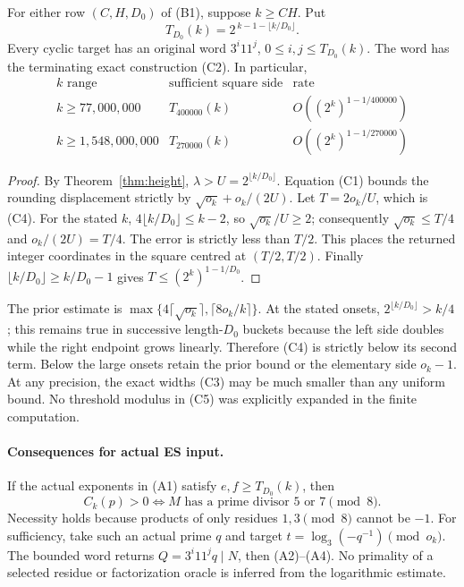 \begin{theorem}\label{thm:capacity}
For either row $(C,H,D_0)$ of (B1), suppose $k\ge CH$. Put
\[
 \boxed{T_{D_0}(k)=2^{\,k-1-\lfloor k/D_0\rfloor}.}        \tag{C4}
\]
Every cyclic target has an original word $3^i11^j$, $0\le i,j\le T_{D_0}(k)$.
The word has the terminating exact construction (C2). In particular,
\[
\begin{array}{c|c|c}
 k\text{ range}&\text{sufficient square side}&\text{rate}\\\hline
 k\ge77{,}000{,}000&T_{400000}(k)&O((2^k)^{1-1/400000})\\
 k\ge1{,}548{,}000{,}000&T_{270000}(k)&O((2^k)^{1-1/270000})
\end{array}                                                   \tag{C5}
\]
\end{theorem}
\begin{proof}
By Theorem~\ref{thm:height}, $\lambda>U=2^{\lfloor k/D_0\rfloor}$.
Equation (C1) bounds the rounding displacement strictly by
$\sqrt{o_k}+o_k/(2U)$. Let $T=2o_k/U$, which is (C4).
For the stated $k$, $4\lfloor k/D_0\rfloor\le k-2$, so
$\sqrt{o_k}/U\ge2$; consequently $\sqrt{o_k}\le T/4$ and
$o_k/(2U)=T/4$. The error is strictly less than $T/2$.
This places the returned integer coordinates in the square centred at $(T/2,T/2)$.
Finally $\lfloor k/D_0\rfloor\ge k/D_0-1$ gives
$T\le(2^k)^{1-1/D_0}$.
\end{proof}

The prior estimate is
$\max\{4\lceil\sqrt{o_k}\rceil,\lceil8o_k/k\rceil\}$.
At the stated onsets, $2^{\lfloor k/D_0\rfloor}>k/4$; this remains true in
successive length-$D_0$ buckets because the left side doubles while the
right endpoint grows linearly. Therefore (C4) is strictly below its second
term. Below the large onsets retain the prior bound or the elementary side
$o_k-1$. At any precision, the exact widths (C3) may be much smaller than
any uniform bound. No threshold modulus in (C5) was explicitly expanded in
the finite computation.

\paragraph{Consequences for actual ES input.}
If the actual exponents in (A1) satisfy $e,f\ge T_{D_0}(k)$, then
\[
 \boxed{C_k(p)>0\iff M\text{ has a prime divisor }5\text{ or }7\pmod8.}
                                                               \tag{C6}
\]
Necessity holds because products of only residues $1,3\pmod8$ cannot be $-1$.
For sufficiency, take such an actual prime $q$ and target
$t=\log_3(-q^{-1})\pmod{o_k}$. The bounded word returns
$Q=3^i11^jq\mid N$, then (A2)--(A4). No primality of a selected residue or
factorization oracle is inferred from the logarithmic estimate.

